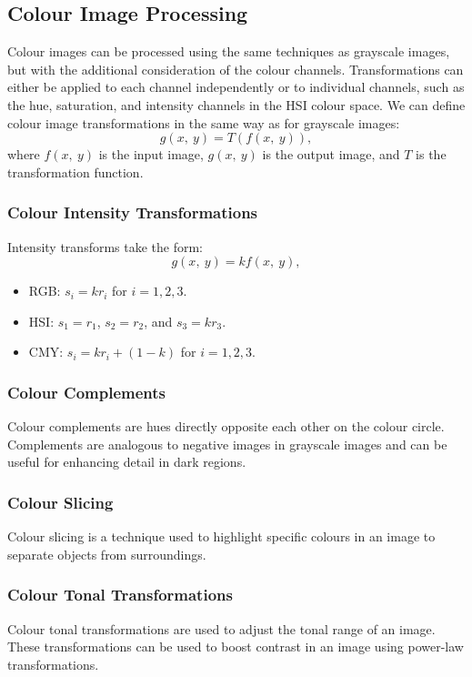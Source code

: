 \documentclass{article}
\begin{document}
\subsection{Colour Image Processing}
Colour images can be processed using the same techniques as grayscale
images, but with the additional consideration of the colour channels.
Transformations can either be applied to each channel independently or
to individual channels, such as the hue, saturation, and intensity
channels in the HSI colour space. We can define colour image
transformations in the same way as for grayscale images:
\begin{equation*}
    g\left( x,\: y \right) = T\left( f\left( x,\: y \right) \right),
\end{equation*}
where \(f\left( x,\: y \right)\) is the input image, \(g\left( x,\: y \right)\)
is the output image, and \(T\) is the transformation function.
\subsubsection{Colour Intensity Transformations}
Intensity transforms take the form:
\begin{equation*}
    g\left( x,\: y \right) = k f\left( x,\: y \right),
\end{equation*}
\begin{itemize}
    \item RGB: \(s_i = k r_i\) for \(i = 1, 2, 3\).
    \item HSI: \(s_1 = r_1\), \(s_2 = r_2\), and \(s_3 = k r_3\).
    \item CMY: \(s_i = k r_i + \left( 1 - k \right)\) for \(i = 1, 2,
          3\).
\end{itemize}
\subsubsection{Colour Complements}
Colour complements are hues directly opposite each other on the colour
circle. Complements are analogous to negative images in grayscale
images and can be useful for enhancing detail in dark regions.
\subsubsection{Colour Slicing}
Colour slicing is a technique used to highlight specific colours in an
image to separate objects from surroundings.
\subsubsection{Colour Tonal Transformations}
Colour tonal transformations are used to adjust the tonal range of an
image. These transformations can be used to boost contrast in an image
using power-law transformations.
\end{document}

